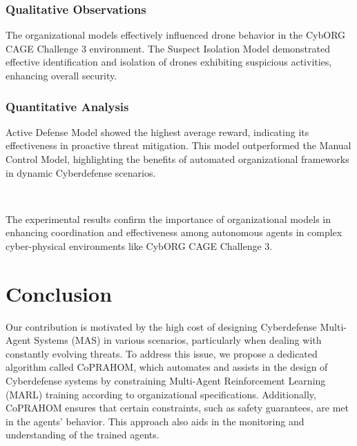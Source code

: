 \documentclass[conference]{IEEEtran}
\begin{document}
\subsubsection{Qualitative Observations}

The organizational models effectively influenced drone behavior in the CybORG CAGE Challenge 3 environment. The Suspect Isolation Model demonstrated effective identification and isolation of drones exhibiting suspicious activities, enhancing overall security.

\subsubsection{Quantitative Analysis}

{Active Defense Model} showed the highest average reward, indicating its effectiveness in proactive threat mitigation. This model outperformed the Manual Control Model, highlighting the benefits of automated organizational frameworks in dynamic Cyberdefense scenarios.

\

The experimental results confirm the importance of organizational models in enhancing coordination and effectiveness among autonomous agents in complex cyber-physical environments like CybORG CAGE Challenge 3.



\section{Conclusion}\label{sec:conclusion}

Our contribution is motivated by the high cost of designing Cyberdefense Multi-Agent Systems (MAS) in various scenarios, particularly when dealing with constantly evolving threats. To address this issue, we propose a dedicated algorithm called CoPRAHOM, which automates and assists in the design of Cyberdefense systems by constraining Multi-Agent Reinforcement Learning (MARL) training according to organizational specifications. Additionally, CoPRAHOM ensures that certain constraints, such as safety guarantees, are met in the agents' behavior. This approach also aids in the monitoring and understanding of the trained agents.
\end{document}
